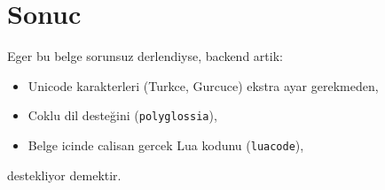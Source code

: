 \documentclass[12pt]{article}
\begin{document}
\section{Sonuc}
Eger bu belge sorunsuz derlendiyse, backend artik:
\begin{itemize}
    \item Unicode karakterleri (Turkce, Gurcuce) ekstra ayar gerekmeden,
    \item Coklu dil desteğini (\texttt{polyglossia}),
    \item Belge icinde calisan gercek Lua kodunu (\texttt{luacode}),
\end{itemize}
destekliyor demektir.
\end{document}

